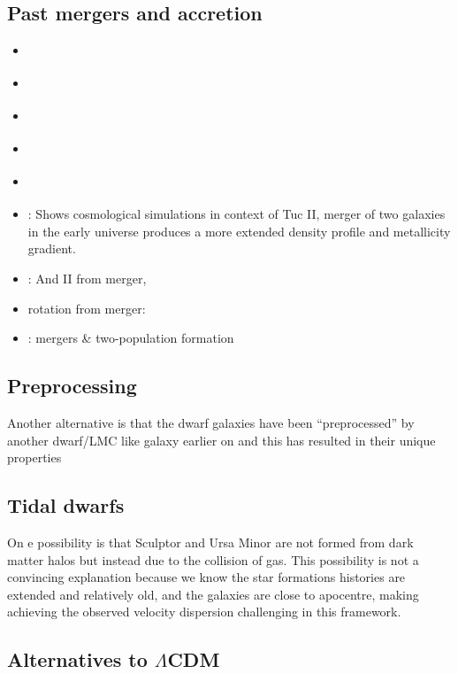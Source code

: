 \subsection{Past mergers and
accretion}\label{past-mergers-and-accretion}

\begin{itemize}
\tightlist
\item
  \citet{deason+2014}
\item
  \citet{deason+2022}
\item
  \citet{ricotti+polisensky+cleland2022}
\item
  \citet{querci+2025}
\item
  \citet{amorisco+evans+vandeven2014}
\item
  \citet{tarumi+yoshida+frebel2021}: Shows cosmological simulations in
  context of Tuc II, merger of two galaxies in the early universe
  produces a more extended density profile and metallicity gradient.
\item
  \citet{lokas+2014}: And II from merger,
\item
  rotation from merger: \citet{cardona-barrero+2021}
\item
  \citet{genina+2019}: mergers \& two-population formation
\end{itemize}

\subsection{Preprocessing}\label{preprocessing}

Another alternative is that the dwarf galaxies have been
``preprocessed'' by another dwarf/LMC like galaxy earlier on and this
has resulted in their unique properties

\subsection{Tidal dwarfs}\label{tidal-dwarfs}

On e possibility is that Sculptor and Ursa Minor are not formed from
dark matter halos but instead due to the collision of gas. This
possibility is not a convincing explanation because we know the star
formations histories are extended and relatively old, and the galaxies
are close to apocentre, making achieving the observed velocity
dispersion challenging in this framework.

\subsection{\texorpdfstring{Alternatives to
\(\Lambda\)CDM}{Alternatives to \textbackslash LambdaCDM}}\label{alternatives-to-lambdacdm}

